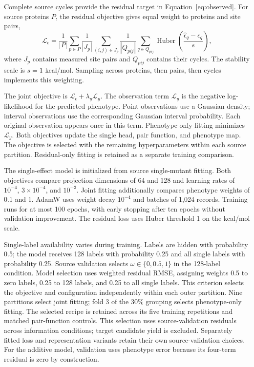 \documentclass{llncs}
\begin{document}
Complete source cycles provide the residual target in Equation~\eqref{eq:observed}. For source proteins $P$, the residual objective gives equal weight to proteins and site pairs,
\begin{equation}
\mathcal L_\epsilon=
\frac{1}{|P|}\sum_{p\in P}\frac{1}{|J_p|}\sum_{(i,j)\in J_p}
\frac{1}{|Q_{pij}|}\sum_{q\in Q_{pij}}
\operatorname{Huber}\!\left(\frac{\widehat\epsilon_q-\epsilon_q}{s}\right),
\end{equation}
where $J_p$ contains measured site pairs and $Q_{pij}$ contains their cycles. The stability scale is $s=1$ kcal/mol. Sampling across proteins, then pairs, then cycles implements this weighting.

The joint objective is $\mathcal L_\epsilon+\lambda_y\mathcal L_y$. The observation term $\mathcal L_y$ is the negative log-likelihood for the predicted phenotype. Point observations use a Gaussian density; interval observations use the corresponding Gaussian interval probability. Each original observation appears once in this term. Phenotype-only fitting minimizes $\mathcal L_y$. Both objectives update the single head, pair function, and phenotype map. The objective is selected with the remaining hyperparameters within each source partition. Residual-only fitting is retained as a separate training comparison.

The single-effect model is initialized from source single-mutant fitting. Both objectives compare projection dimensions of 64 and 128 and learning rates of $10^{-4}$, $3\times10^{-4}$, and $10^{-3}$. Joint fitting additionally compares phenotype weights of 0.1 and 1. AdamW uses weight decay $10^{-4}$ and batches of 1,024 records. Training runs for at most 100 epochs, with early stopping after ten epochs without validation improvement. The residual loss uses Huber threshold 1 on the kcal/mol scale.

Single-label availability varies during training. Labels are hidden with probability 0.5; the model receives 128 labels with probability 0.25 and all single labels with probability 0.25. Source validation selects $\omega\in\{0,0.5,1\}$ in the 128-label condition. Model selection uses weighted residual RMSE, assigning weights 0.5 to zero labels, 0.25 to 128 labels, and 0.25 to all single labels. This criterion selects the objective and configuration independently within each outer partition. Nine partitions select joint fitting; fold 3 of the 30\% grouping selects phenotype-only fitting. The selected recipe is retained across its five training repetitions and matched pair-function controls. This selection uses source-validation residuals across information conditions; target candidate yield is excluded. Separately fitted loss and representation variants retain their own source-validation choices. For the additive model, validation uses phenotype error because its four-term residual is zero by construction.
\end{document}
